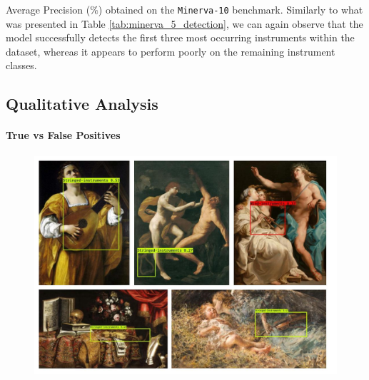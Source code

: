 \begin{table}
	\caption{Average Precision ($\%$) obtained on the \texttt{Minerva-10} benchmark. Similarly to what was presented in Table \ref{tab:minerva_5_detection}, we can again observe that the model successfully detects the first three most occurring instruments within the dataset, whereas it appears to perform poorly on the remaining instrument classes.}
\resizebox{\columnwidth}{!}{%
}
\label{table:minerva_10_detection}
\end{table}





\begin{figure}[htb!]
	\scalebox{0.8}{}
	\caption{}
	\label{fig:detection_experiment_2}
\end{figure}



\begin{figure}[htb!]
	\scalebox{0.8}{}
	\caption{}
	\label{fig:detection_experiment_3}
\end{figure}


\begin{figure}[htb!]
	\scalebox{0.8}{}
	\caption{}
	\label{fig:detection_experiment_4}
\end{figure}




\subsection{Qualitative Analysis}
\paragraph{True vs False Positives}

\begin{figure}[ht!]
\centering
  \includegraphics[width=\linewidth]{./Images/Chapter05/wikiart_detections}
  \caption{}
  \label{fig:wikiart_detections}
\end{figure}



